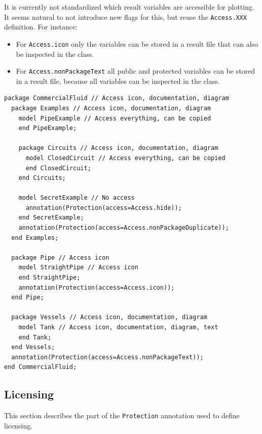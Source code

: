 \begin{nonnormative}
It is currently not standardized which result variables are accessible for plotting.
It seems natural to not introduce new flags for this, but reuse the \lstinline!Access.XXX! definition.
For instance:
\begin{itemize}
\item For \lstinline!Access.icon! only the variables can be stored in a result file that can also be inspected in the class.
\item For \lstinline!Access.nonPackageText! all public and protected variables can be stored in a result file, because all variables can be inspected in the class.
\end{itemize}

\begin{lstlisting}[language=modelica]
package CommercialFluid // Access icon, documentation, diagram
  package Examples // Access icon, documentation, diagram
    model PipeExample // Access everything, can be copied
    end PipeExample;

    package Circuits // Access icon, documentation, diagram
      model ClosedCircuit // Access everything, can be copied
      end ClosedCircuit;
    end Circuits;

    model SecretExample // No access
      annotation(Protection(access=Access.hide));
    end SecretExample;
    annotation(Protection(access=Access.nonPackageDuplicate));
  end Examples;

  package Pipe // Access icon
    model StraightPipe // Access icon
    end StraightPipe;
    annotation(Protection(access=Access.icon));
  end Pipe;

  package Vessels // Access icon, documentation, diagram
    model Tank // Access icon, documentation, diagram, text
    end Tank;
  end Vessels;
  annotation(Protection(access=Access.nonPackageText));
end CommercialFluid;
\end{lstlisting}
\end{nonnormative}


\subsection{Licensing}\label{licensing}

This section describes the part of the \lstinline!Protection! annotation used to define licensing.

